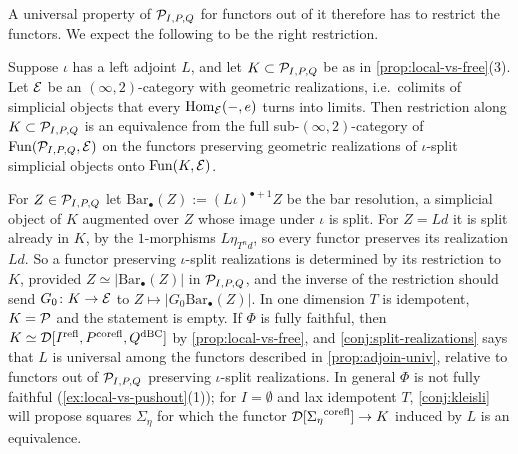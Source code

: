 %
A universal property of $\mathcal{P}_{I,P,Q}$ for functors out of it therefore has to
restrict the functors. We expect the following to be the right restriction.

\begin{conj}
\label{conj:split-realizations}
%
Suppose $\iota$ has a left adjoint $L$, and let
$K \subset \mathcal{P}_{I,P,Q}$
be as in
\cref{prop:local-vs-free}(3). Let $\mathcal{E}$ be an $(\infty,2)$-category with
geometric realizations, i.e.\ colimits of simplicial objects that every
$\operatorname{Hom}_{\mathcal{E}}(-,e)$ turns into limits. Then restriction along
$K \subset \mathcal{P}_{I,P,Q}$
is an equivalence from the full sub-$(\infty,2)$-category of
$\operatorname{Fun}(\mathcal{P}_{I,P,Q},\mathcal{E})$
on the functors preserving geometric realizations of
$\iota$-split simplicial objects onto $\operatorname{Fun}(K,\mathcal{E})$.
\end{conj}

\begin{rmk}
\label{rmk:split-realizations}
%
For $Z \in \mathcal{P}_{I,P,Q}$ let
$\mathrm{Bar}_{\bullet}(Z) := (L\iota)^{\bullet+1}Z$
be the bar resolution, a simplicial object of $K$ augmented over $Z$ whose image
under $\iota$ is split. For $Z = Ld$ it is split already in $K$,
by the $1$-morphisms $L\eta_{T^{n}d}$, so every functor preserves its
realization $Ld$. So a functor preserving $\iota$-split realizations is
determined by its restriction to $K$, provided
$Z \simeq |\mathrm{Bar}_{\bullet}(Z)|$
in $\mathcal{P}_{I,P,Q}$, and the inverse of the restriction should send $G_{0}\colon K
\to \mathcal{E}$ to
$Z \mapsto |G_{0}\mathrm{Bar}_{\bullet}(Z)|$.
In one dimension $T$ is idempotent, $K = \mathcal{P}$ and the statement is empty.
If $\Phi$ is fully faithful, then
$K \simeq \mathcal{D}[{I}^{\mathrm{refl}},{P}^{\mathrm{corefl}},{Q}^{\mathrm{dBC}}]$
by \cref{prop:local-vs-free}, and \cref{conj:split-realizations} says that $L$
is universal among the functors described in \cref{prop:adjoin-univ},
relative to functors out of $\mathcal{P}_{I,P,Q}$ preserving $\iota$-split realizations.
In general $\Phi$ is not fully faithful (\cref{ex:local-vs-pushout}(1));
for $I = \emptyset$ and lax idempotent $T$,
\cref{conj:kleisli} will propose squares $\Sigma_{\eta}$ for which the functor
$\mathcal{D}[{\Sigma_{\eta}}^{\mathrm{corefl}}] \to K$
induced by $L$ is an equivalence.
\end{rmk}

